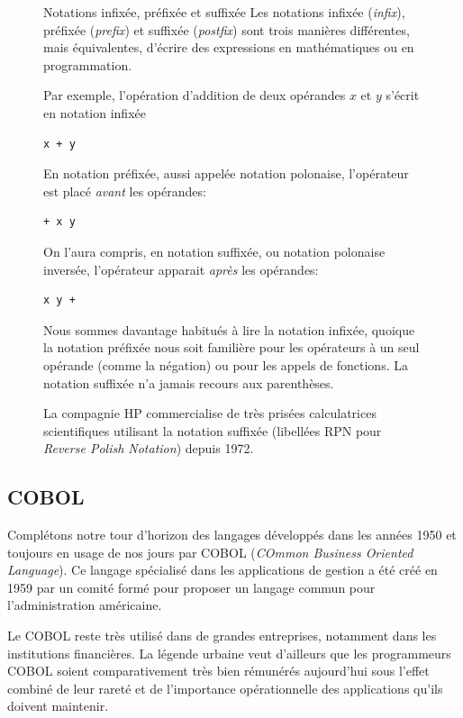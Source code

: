 \begin{figure}[t]
  \setlength{\FrameRule}{1pt}
  \begin{emphbox}{\mdseries Notations infixée, préfixée et suffixée}
    Les notations infixée (\emph{infix}), préfixée (\emph{prefix}) et
    suffixée (\emph{postfix}) sont trois manières différentes, mais
    équivalentes, d'écrire des expressions en mathématiques ou en
    programmation.

    Par exemple, l'opération d'addition de deux opérandes $x$ et $y$
    s'écrit en notation infixée
\begin{lstlisting}[backgroundcolor=\color{codebg}]
x + y
\end{lstlisting}
    En notation préfixée, aussi appelée notation polonaise,
    l'opérateur est placé \emph{avant} les opérandes:
\begin{lstlisting}[backgroundcolor=\color{codebg}]
+ x y
\end{lstlisting}
    On l'aura compris, en notation suffixée, ou notation polonaise
    inversée, l'opérateur apparait \emph{après} les opérandes:
\begin{lstlisting}[backgroundcolor=\color{codebg}]
x y +
\end{lstlisting}
    Nous sommes davantage habitués à lire la notation infixée, quoique
    la notation préfixée nous soit familière pour les opérateurs à un
    seul opérande (comme la négation) ou pour les appels de fonctions.
    La notation suffixée n'a jamais recours aux parenthèses.

    La compagnie HP commercialise de très prisées calculatrices
    scientifiques utilisant la notation suffixée (libellées RPN pour
    \emph{Reverse Polish Notation}) depuis 1972.
  \end{emphbox}
\end{figure}

\subsection{COBOL}
\label{sec:informatique:historique:cobol}

Complétons notre tour d'horizon des langages développés dans les
années 1950 et toujours en usage de nos jours par COBOL (\emph{COmmon
  Business Oriented Language}). Ce langage spécialisé dans les
applications de gestion a été créé en 1959 par un comité formé pour
proposer un langage commun pour l'administration américaine.

Le COBOL reste très utilisé dans de grandes entreprises, notamment
dans les institutions financières. La légende urbaine veut d'ailleurs
que les programmeurs COBOL soient comparativement très bien rémunérés
aujourd'hui sous l'effet combiné de leur rareté et de l'importance
opérationnelle des applications qu'ils doivent maintenir.

